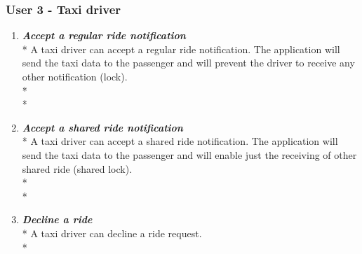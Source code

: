 \subsubsection{User 3 - Taxi driver}
\begin{enumerate}
\item \textit{\textbf{Accept a regular ride notification}}\\*
A taxi driver can accept a regular ride notification. The application will send the taxi data to the passenger and will prevent the driver to receive any other notification (lock).\\*\\*
\item \textit{\textbf{Accept a shared ride notification}}\\*
A taxi driver can accept a shared ride notification. The application will send the taxi data to the passenger and will enable just the receiving of other shared ride (shared lock).\\*\\*
\item \textit{\textbf{Decline a ride}}\\*
A taxi driver can decline a ride request.\\*
\end{enumerate}